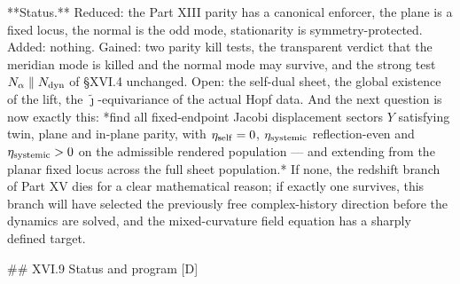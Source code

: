 **Status.** Reduced: the Part XIII parity has a canonical enforcer, the plane is a fixed locus, the normal is the odd mode, stationarity is symmetry-protected. Added: nothing. Gained: two parity kill tests, the transparent verdict that the meridian mode is killed and the normal mode may survive, and the strong test $N_\alpha\parallel N_{\rm dyn}$ of §XVI.4 unchanged. Open: the self-dual sheet, the global existence of the lift, the $\widetilde\jmath$-equivariance of the actual Hopf data. And the next question is now exactly this: *find all fixed-endpoint Jacobi displacement sectors $Y$ satisfying twin, plane and in-plane parity, with $\eta_{\rm self} = 0$, $\eta_{\rm systemic}$ reflection-even and $\eta_{\rm systemic}>0$ on the admissible rendered population — and extending from the planar fixed locus across the full sheet population.* If none, the redshift branch of Part XV dies for a clear mathematical reason; if exactly one survives, this branch will have selected the previously free complex-history direction before the dynamics are solved, and the mixed-curvature field equation has a sharply defined target.

## XVI.9 Status and program [D]

